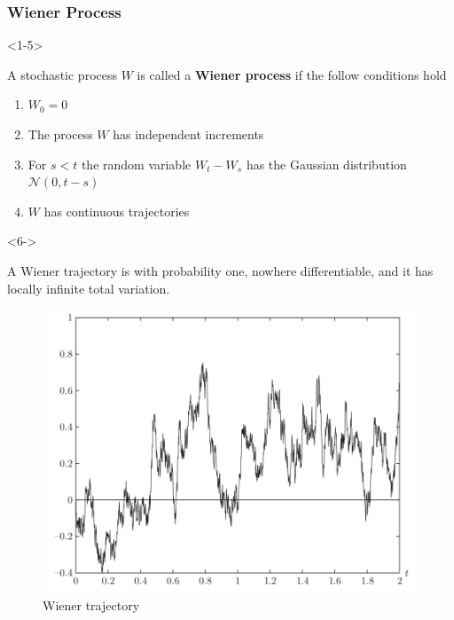 \documentclass[10pt]{beamer}
\begin{document}
\begin{frame}[t]
  \frametitle{Wiener Process}
  \begin{onlyenv}<1-5>
  \begin{definition}
    A stochastic process $W$ is called a \textbf{Wiener process} if the follow conditions hold
    \begin{enumerate}
      \item<2-> $W_0 = 0$
      \item<3-> The process $W$ has independent increments
      \item<4-> For $s < t$ the random variable $W_t - W_s$ has the Gaussian distribution $\mathcal{N}(0,t-s)$
      \item<5-> $W$ has continuous trajectories
    \end{enumerate}
  \end{definition}
  \end{onlyenv}
  \begin{onlyenv}<6->
    \begin{theorem}
      A Wiener trajectory is with probability one, nowhere differentiable, and it has locally infinite total variation.
    \end{theorem}
    \begin{figure}
      \includegraphics[scale=.45]{./graphics/wiener-trajectory.png}
      \caption{Wiener trajectory}
    \end{figure}
  \end{onlyenv}
\end{frame}
\end{document}
